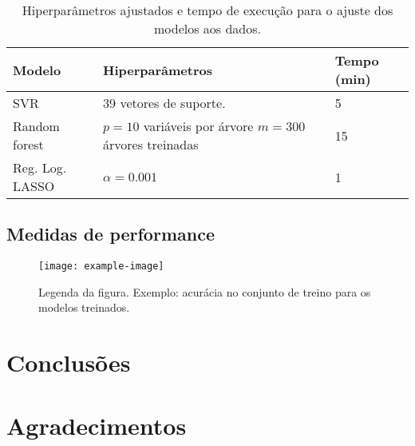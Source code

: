 \documentclass[9pt, a4paper, twocolumn]{article}
\begin{document}
\lipsum[14]

\begin{table}[H]
  \caption{Hiperparâmetros ajustados e tempo de execução para o ajuste dos modelos aos dados.}
  \begin{tabular}{p{1.5cm} p{4.5cm} p{3em}}
    \hline
    Modelo & Hiperparâmetros & Tempo (min) \\ \hline
    SVR & 39 vetores de suporte. & 5 \\[1ex]
    Random forest & {$p = 10$ variáveis por árvore\newline
                    $m = 300$ árvores treinadas} & 15\\[4ex]
    Reg. Log. LASSO & {$\alpha = 0.001$} & 1\\ \hline
  \end{tabular}
\end{table}

\subsection{Medidas de performance}

\lipsum[15]

\begin{figure}[H]
  \centering
  \texttt{[image: example-image]}
  \caption{Legenda da figura. Exemplo: acurácia no conjunto de treino para os modelos treinados.}
  \label{fig_01}
\end{figure}


\section{Conclusões}\label{Conclusao}

\lipsum[16]

\section*{Agradecimentos}

\lipsum[17]


%
%
\end{document}
